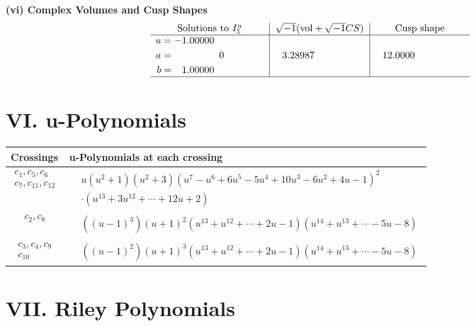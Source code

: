 \documentclass[1p]{elsarticle_modified}
\theoremstyle{definition}
\newcommand{\I}{\sqrt{-1}}
\begin{document}
\newpage\flushleft \textbf{(vi) Complex Volumes and Cusp Shapes}
$$\begin{array}{c|c|c}  
\text{Solutions to }I^u_{5}& \I (\text{vol} + \sqrt{-1}CS) & \text{Cusp shape}\\
 \hline 
\begin{aligned}
u &= -1.00000\phantom{ +0.000000I} \\
a &= \phantom{-0.000000 } 0 \\
b &= \phantom{-}1.00000\phantom{ +0.000000I}\end{aligned}
 & \phantom{-}3.28987\phantom{ +0.000000I} & \phantom{-}12.0000\phantom{ +0.000000I}\\
 \hline 
 \end{array}$$\newpage
\newpage\renewcommand{\arraystretch}{1}
\centering \section*{ VI. u-Polynomials}
\begin{tabular}{m{50pt}|m{274pt}}
Crossings & \hspace{64pt}u-Polynomials at each crossing \\
\hline $$\begin{aligned}c_{1},c_{5},c_{6}\\c_{7},c_{11},c_{12}\end{aligned}$$&$\begin{aligned}
&u(u^2+1)(u^2+3)(u^7- u^6+6 u^5-5 u^4+10 u^3-6 u^2+4 u-1)^2\\
&\cdot(u^{13}+3 u^{12}+\cdots+12 u+2)
\end{aligned}$\\
\hline $$\begin{aligned}c_{2},c_{8}\end{aligned}$$&$\begin{aligned}
&((u-1)^3)(u+1)^2(u^{13}+u^{12}+\cdots+2 u-1)(u^{14}+u^{13}+\cdots-5 u-8)
\end{aligned}$\\
\hline $$\begin{aligned}c_{3},c_{4},c_{9}\\c_{10}\end{aligned}$$&$\begin{aligned}
&((u-1)^2)(u+1)^3(u^{13}+u^{12}+\cdots+2 u-1)(u^{14}+u^{13}+\cdots-5 u-8)
\end{aligned}$\\
\hline
\end{tabular}\newpage\renewcommand{\arraystretch}{1}
\centering \section*{ VII. Riley Polynomials}
\end{document}
